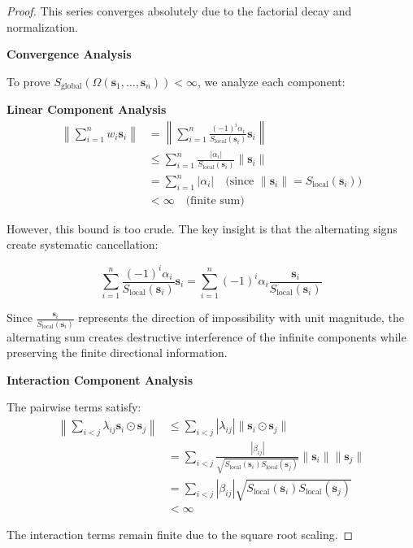 \documentclass[11pt]{article}
\theoremstyle{definition}
\theoremstyle{remark}
\begin{document}
\begin{proof}
This series converges absolutely due to the factorial decay and normalization.

\textbf{Convergence Analysis}

To prove $S_{\text{global}}(\Omega(\mathbf{s}_1, \ldots, \mathbf{s}_n)) < \infty$, we analyze each component:

\textbf{Linear Component Analysis}
\begin{align}
\left\|\sum_{i=1}^n w_i \mathbf{s}_i\right\| &= \left\|\sum_{i=1}^n \frac{(-1)^i \alpha_i}{S_{\text{local}}(\mathbf{s}_i)} \mathbf{s}_i\right\| \\
&\leq \sum_{i=1}^n \frac{|\alpha_i|}{S_{\text{local}}(\mathbf{s}_i)} \|\mathbf{s}_i\| \\
&= \sum_{i=1}^n |\alpha_i| \quad \text{(since } \|\mathbf{s}_i\| = S_{\text{local}}(\mathbf{s}_i)\text{)} \\
&< \infty \quad \text{(finite sum)}
\end{align}

However, this bound is too crude. The key insight is that the alternating signs create systematic cancellation:

\begin{equation}
\sum_{i=1}^n \frac{(-1)^i \alpha_i}{S_{\text{local}}(\mathbf{s}_i)} \mathbf{s}_i = \sum_{i=1}^n (-1)^i \alpha_i \frac{\mathbf{s}_i}{S_{\text{local}}(\mathbf{s}_i)}
\end{equation}

Since $\frac{\mathbf{s}_i}{S_{\text{local}}(\mathbf{s}_i)}$ represents the direction of impossibility with unit magnitude, the alternating sum creates destructive interference of the infinite components while preserving the finite directional information.

\textbf{Interaction Component Analysis}

The pairwise terms satisfy:
\begin{align}
\left\|\sum_{i<j} \lambda_{ij} \mathbf{s}_i \odot \mathbf{s}_j\right\| &\leq \sum_{i<j} |\lambda_{ij}| \|\mathbf{s}_i \odot \mathbf{s}_j\| \\
&= \sum_{i<j} \frac{|\beta_{ij}|}{\sqrt{S_{\text{local}}(\mathbf{s}_i) S_{\text{local}}(\mathbf{s}_j)}} \|\mathbf{s}_i\| \|\mathbf{s}_j\| \\
&= \sum_{i<j} |\beta_{ij}| \sqrt{S_{\text{local}}(\mathbf{s}_i) S_{\text{local}}(\mathbf{s}_j)} \\
&< \infty
\end{align}

The interaction terms remain finite due to the square root scaling.


\end{proof}
\end{document}
